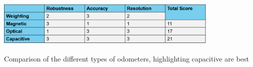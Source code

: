 \documentclass[11pt]{article}		%
\newcommand{\supercite}[1]{\textsuperscript{\cite{#1}}}		%
\newcommand{\tableref}[1]{\hyperref[#1]{Table \ref*{#1}}}     %
\begin{document}
	        \begin{table}[h]
    			\centering
    			\includegraphics[width=0.8\textwidth]{Encoder comparison table}
    			\caption{Comparison of the different types of odometers, highlighting capacitive are best}
    			\label{odometer_comparison}
			\end{table}			
\end{document}
